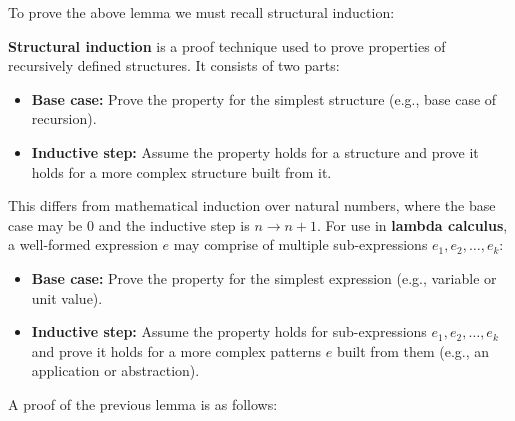 \noindent 
To prove the above lemma we must recall structural induction:
\begin{Def}

    \textbf{Structural induction} is a proof technique used to prove properties of recursively defined structures. It consists of two parts:
    \begin{itemize}
        \item \textbf{Base case:} Prove the property for the simplest structure (e.g., base case of recursion).
        \item \textbf{Inductive step:} Assume the property holds for a structure and prove it holds for a more complex structure built from it.
    \end{itemize}
    
    \noindent
    This differs from mathematical induction over natural numbers, where the base case may be $0$ and the inductive step is $n \to n+1$. For use in 
    \textbf{lambda calculus}, a well-formed expression $e$ may comprise of multiple sub-expressions $e_1, e_2, \ldots, e_k$:
    \begin{itemize}
        \item \textbf{Base case:} Prove the property for the simplest expression (e.g., variable or unit value).
        \item \textbf{Inductive step:} Assume the property holds for sub-expressions $e_1, e_2, \ldots, e_k$ and prove it holds for a more complex patterns $e$ built from them (e.g., an application or abstraction).
    \end{itemize}
\end{Def}
\noindent
A proof of the previous lemma is as follows:
